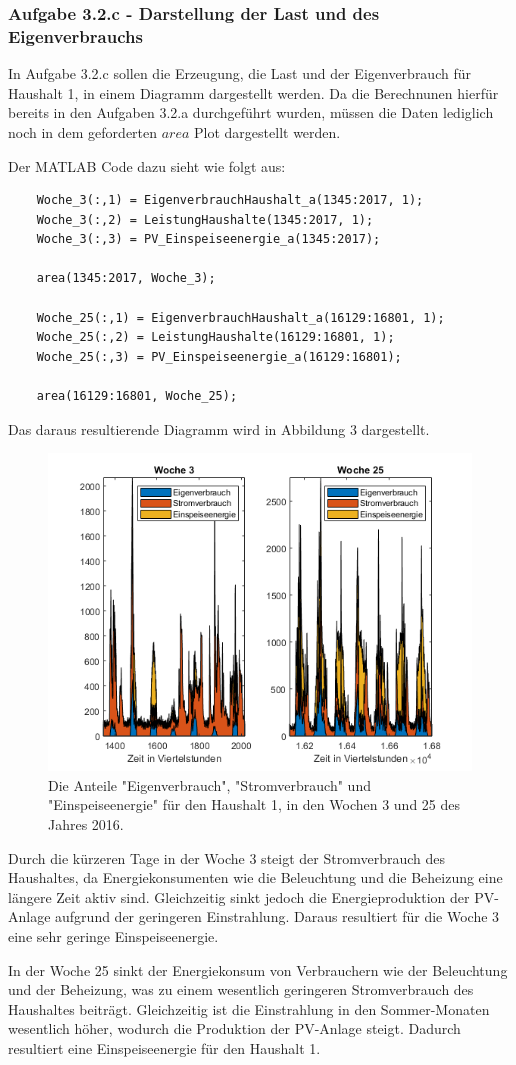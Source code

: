 \documentclass[a4paper,12pt]{article}
\begin{document}
	\subsubsection{Aufgabe 3.2.c - Darstellung der Last und des Eigenverbrauchs}
	In Aufgabe 3.2.c sollen die Erzeugung, die Last und der Eigenverbrauch für Haushalt 1, in einem Diagramm dargestellt werden.\newline
	Da die Berechnunen hierfür bereits in den Aufgaben 3.2.a durchgeführt wurden, müssen die Daten lediglich noch in dem geforderten $area$ Plot dargestellt werden.\\ \par
	\noindent Der MATLAB Code dazu sieht wie folgt aus:
	\begin{lstlisting}
	Woche_3(:,1) = EigenverbrauchHaushalt_a(1345:2017, 1);
	Woche_3(:,2) = LeistungHaushalte(1345:2017, 1);
	Woche_3(:,3) = PV_Einspeiseenergie_a(1345:2017);
	
	area(1345:2017, Woche_3);
	
	Woche_25(:,1) = EigenverbrauchHaushalt_a(16129:16801, 1);
	Woche_25(:,2) = LeistungHaushalte(16129:16801, 1);
	Woche_25(:,3) = PV_Einspeiseenergie_a(16129:16801);
	
	area(16129:16801, Woche_25);
	\end{lstlisting}
	Das daraus resultierende Diagramm wird in Abbildung 3 dargestellt.
	\begin{figure}[H]
		\centering
		\includegraphics[width=12cm]{img/results/LastundEigenverbrauch}
		\caption{Die Anteile "Eigenverbrauch", "Stromverbrauch" und "Einspeiseenergie" für den Haushalt 1, in den Wochen 3 und 25 des Jahres 2016.}
	\end{figure}
	\noindent Durch die kürzeren Tage in der Woche 3 steigt der Stromverbrauch des Haushaltes, da Energiekonsumenten wie die Beleuchtung und die Beheizung eine längere Zeit aktiv sind. Gleichzeitig sinkt jedoch die Energieproduktion der PV-Anlage aufgrund der geringeren Einstrahlung. Daraus resultiert für die Woche 3 eine sehr geringe Einspeiseenergie.\\ \par
	\noindent In der Woche 25 sinkt der Energiekonsum von Verbrauchern wie der Beleuchtung und der Beheizung, was zu einem wesentlich geringeren Stromverbrauch des Haushaltes beiträgt. Gleichzeitig ist die Einstrahlung in den Sommer-Monaten wesentlich höher, wodurch die Produktion der PV-Anlage steigt. Dadurch resultiert eine Einspeiseenergie für den Haushalt 1.
\end{document}

